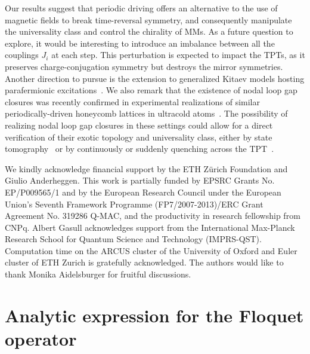 \documentclass[aps,prb,twocolumn,superscriptaddress,groupedaddress]{revtex4}
\begin{document}
Our results suggest that periodic driving offers an alternative to the use of magnetic fields to break time-reversal symmetry, and consequently manipulate the universality class and control the chirality of MMs. 
As a future question to explore, it would be interesting to introduce an imbalance between all the couplings $J_i$ at each step. 
This perturbation is expected to impact the TPTs, as it preserves charge-conjugation symmetry but destroys the mirror symmetries.
Another direction to pursue is the extension to generalized Kitaev models hosting parafermionic excitations~\cite{Barkeshli:2015}.
We also remark that the existence of nodal loop gap closures was recently confirmed in experimental realizations of similar periodically-driven honeycomb lattices in ultracold atoms~\cite{Wintersperger:2020}.
The possibility of realizing nodal loop gap closures in these settings could allow for a direct verification of their exotic topology and universality class, either by state tomography~\cite{Flaescher:2016} or by continuously or suddenly quenching across the TPT~\cite{Liou:2018}.





\acknowledgments

We kindly acknowledge financial support by the ETH Z\"{u}rich Foundation and Giulio Anderheggen.
This work is partially funded by EPSRC Grants No. EP/P009565/1 and by the European Research Council under the European Union's Seventh Framework Programme (FP7/2007-2013)/ERC Grant Agreement No. 319286 Q-MAC, and the productivity in research fellowship from CNPq. 
Albert Gasull acknowledges support from the International Max-Planck Research School for Quantum Science and Technology (IMPRS-QST).
Computation time on the ARCUS cluster of the University of Oxford and Euler cluster of ETH Zurich is gratefully acknowledged.
The authors would like to thank Monika Aidelsburger for fruitful discussions. 
 


\appendix

\section{Analytic expression for the Floquet operator}
\label{app:anal-UF}
\end{document}

